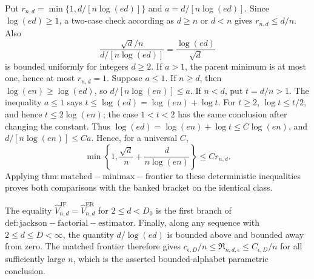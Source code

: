 Put \(r_{n,d}=\min\{1,d/[n\log(ed)]\}\) and \(a=d/[n\log(ed)]\).  Since \(\log(ed)\geq1\), a two-case check according as \(d\geq n\) or \(d<n\) gives \(r_{n,d}\leq d/n\).  Also
\[
 \frac{\sqrt d/n}{d/[n\log(ed)]}=\frac{\log(ed)}{\sqrt d}
\]
is bounded uniformly for integers \(d\geq2\).  If \(a>1\), the parent minimum is at most one, hence at most \(r_{n,d}=1\).  Suppose \(a\leq1\).  If \(n\geq d\), then \(\log(en)\geq\log(ed)\), so
\(d/[n\log(en)]\leq a\).  If \(n<d\), put \(t=d/n>1\).  The inequality \(a\leq1\) says \(t\leq\log(ed)=\log(en)+\log t\).  For \(t\geq2\), \(\log t\leq t/2\), and hence \(t\leq2\log(en)\); the case \(1<t<2\) has the same conclusion after changing the constant.  Thus \(\log(ed)=\log(en)+\log t\leq C\log(en)\), and \(d/[n\log(en)]\leq Ca\).  Hence, for a universal \(C\),
\[
 \min\left\{1,\frac{\sqrt d}{n}+\frac d{n\log(en)}\right\}
 \leq C r_{n,d}.                                                       \tag{33}
\]
Applying \(\mathrm{thm:matched-minimax-frontier}\) to these deterministic inequalities proves both comparisons with the banked bracket on the identical class.

The equality \(\widehat V_{n,d}^{\mathrm{JF}}=\widehat V_{n,d}^{\mathrm{ER}}\) for \(2\leq d<D_0\) is the first branch of \(\mathrm{def:jackson-factorial-estimator}\).  Finally, along any sequence with \(2\leq d\leq D<\infty\), the quantity \(d/\log(ed)\) is bounded above and bounded away from zero.  The matched frontier therefore gives \(c_{\epsilon,D}/n\leq\mathfrak R_{n,d,\epsilon}\leq C_{\epsilon,D}/n\) for all sufficiently large \(n\), which is the asserted bounded-alphabet parametric conclusion.